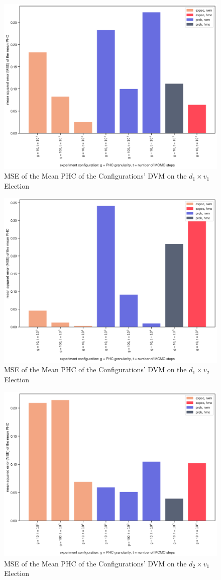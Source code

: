 \begin{figure}[ht]\centering
 \includegraphics[width=0.75\linewidth]{figures/1_1_mean_mse.png}
 \caption{MSE of the Mean PHC of the Configurations' DVM on the $d_1 \times v_1$ Election}
 \label{fig:1_1_mean_mse_append}
\end{figure}

\begin{figure}[ht]\centering
 \includegraphics[width=0.75\linewidth]{figures/1_2_mean_mse.png}
 \caption{MSE of the Mean PHC of the Configurations' DVM on the $d_1 \times v_2$ Election}
 \label{fig:1_2_mean_mse}
\end{figure}

\begin{figure}[ht]\centering
 \includegraphics[width=0.75\linewidth]{figures/2_1_mean_mse.png}
 \caption{MSE of the Mean PHC of the Configurations' DVM on the $d_2 \times v_1$ Election}
 \label{fig:2_1_mean_mse}
\end{figure}

